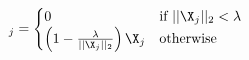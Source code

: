 \documentclass[preview,border=0.3pt]{standalone}
\begin{document}
%
\begin{equation*}
[\mathrm{prox}_{g}(\X)]_j = 
    \begin{cases}
        0&\text{if}\ ||\X_j||_2 < \lambda\\
        \left(1-\frac{\lambda}{||\X_j||_2}\right)\X_j&\text{otherwise}\\
    \end{cases}\label{eq}
\end{equation*}
\end{document}
